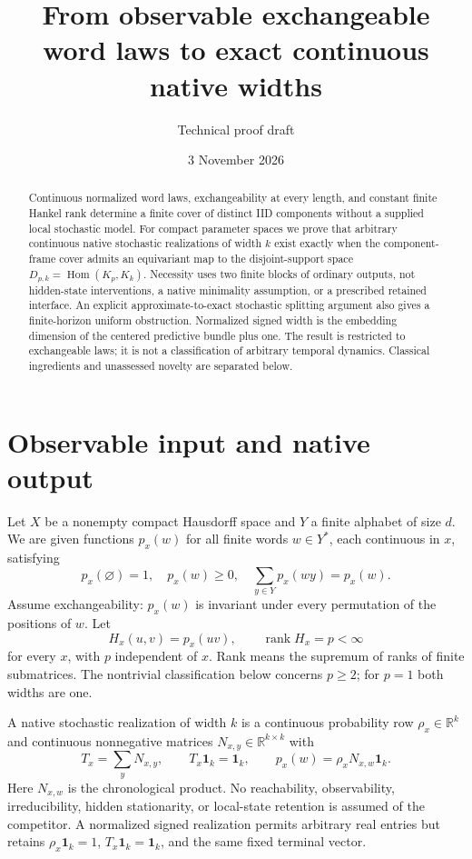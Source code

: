 \documentclass[11pt]{article}
\title{From observable exchangeable word laws to exact continuous native widths}
\author{Technical proof draft}
\date{3 November 2026}
\theoremstyle{remark}\newtheorem{remark}[theorem]{Remark}
\newcommand{\R}{\mathbb R}
\newcommand{\one}{\mathbf 1}
\newcommand{\rank}{\operatorname{rank}}
\newcommand{\Hom}{\operatorname{Hom}}
\begin{document}
\maketitle
\begin{abstract}
Continuous normalized word laws, exchangeability at every length, and constant finite Hankel rank determine a finite cover of distinct IID components without a supplied local stochastic model. For compact parameter spaces we prove that arbitrary continuous native stochastic realizations of width $k$ exist exactly when the component-frame cover admits an equivariant map to the disjoint-support space $D_{p,k}=\Hom(K_p,K_k)$. Necessity uses two finite blocks of ordinary outputs, not hidden-state interventions, a native minimality assumption, or a prescribed retained interface. An explicit approximate-to-exact stochastic splitting argument also gives a finite-horizon uniform obstruction. Normalized signed width is the embedding dimension of the centered predictive bundle plus one. The result is restricted to exchangeable laws; it is not a classification of arbitrary temporal dynamics. Classical ingredients and unassessed novelty are separated below.
\end{abstract}

\section{Observable input and native output}
Let $X$ be a nonempty compact Hausdorff space and $Y$ a finite alphabet of size $d$. We are given functions $p_x(w)$ for all finite words $w\in Y^*$, each continuous in $x$, satisfying
\[
 p_x(\varnothing)=1,\quad p_x(w)\geq0,\quad
 \sum_{y\in Y}p_x(wy)=p_x(w).
\]
Assume exchangeability: $p_x(w)$ is invariant under every permutation of the positions of $w$. Let
\[
 H_x(u,v)=p_x(uv),\qquad \rank H_x=p<\infty
\]
for every $x$, with $p$ independent of $x$. Rank means the supremum of ranks of finite submatrices. The nontrivial classification below concerns $p\geq2$; for $p=1$ both widths are one.

A native stochastic realization of width $k$ is a continuous probability row $\rho_x\in\R^k$ and continuous nonnegative matrices $N_{x,y}\in\R^{k\times k}$ with
\[
 T_x=\sum_yN_{x,y},\qquad T_x\one_k=\one_k,
 \qquad p_x(w)=\rho_xN_{x,w}\one_k.
\]
Here $N_{x,w}$ is the chronological product. No reachability, observability, irreducibility, hidden stationarity, or local-state retention is assumed of the competitor. A normalized signed realization permits arbitrary real entries but retains $\rho_x\one_k=1$, $T_x\one_k=\one_k$, and the same fixed terminal vector.
\end{document}
